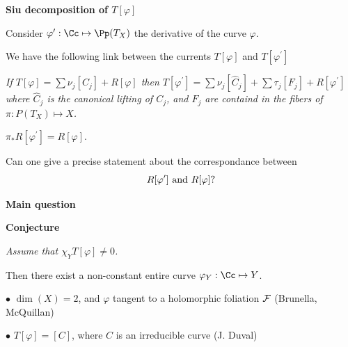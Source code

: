 \begin{slide}
\par\vspace{\bigskipamount}\noindent
{\large\bf Siu decomposition of $T[\varphi]$}

\par\vspace{\bigskipamount}\noindent
Consider $\varphi^\prime:{\Cc}\mapsto {\Pp}(T_X)$ the derivative of the curve $\varphi$. 

We have the 
following link between the currents $T[\varphi]$ and $T[\varphi^\prime]$

\par\vspace{\bigskipamount}\noindent
{} {\sl If \hskip 0.2cm $T[\varphi]= \sum\nu_j[C_j]+ R[\varphi]$
\hskip 0.2cm then \hskip 0.2cm
$T[\varphi^\prime]= \sum\nu_j[\widehat C_j]+ \sum\tau_j[F_j]+ R[\varphi^\prime]$ 
\noindent where
$\widehat C_j$ is the canonical lifting of $C_j$, and $F_j$ are containd in the fibers of
$\pi: P(T_X)\mapsto X$.}

\par\vspace{\bigskipamount}\noindent
{} $\pi_*R[\varphi^\prime]=  R[\varphi]$.

\par\vspace{\bigskipamount}\noindent
{} Can one give a precise statement about the correspondance between
$$R[\varphi^\prime]\hbox { and } R[\varphi]?$$

\end{slide}


\begin{slide}
\par\vspace{\bigskipamount}\noindent
{\large\bf Main question}

\par\vspace{\bigskipamount}\noindent
{\bf Conjecture} {\sl Assume that $\chi_YT[\varphi]\not = 0$. 

\hskip 2.2cm Then there exist a non-constant 
entire curve $\varphi_Y:{\Cc}\mapsto Y$.}

\par\vspace{\bigskipamount}\noindent
{}

$\bullet$ $\dim(X)= 2$, and $\varphi$ tangent to a holomorphic foliation
${\cal F}$ (Brunella, McQuillan)

$\bullet$ $T[\varphi]=  [C]$, where $C$ is an irreducible curve (J. Duval)


\end{slide}%

 